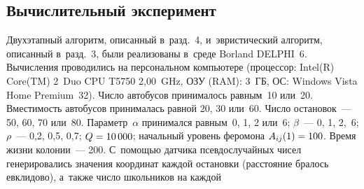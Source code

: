 \begin{multicols}{2}
\vspace*{-9pt}



\section{Вычислительный эксперимент}

\vspace*{-2pt}

     Двухэтапный алгоритм, описанный в~разд.~4, и~эвристический алгоритм,
описанный в~разд.~3, были реализованы в~среде Borland DELPHI~6. Вычисления
проводились на персональном компьютере
(процессор: Intel(R) Core(TM) 2~Duo CPU T5750 2,00~GHz,
ОЗУ (RAM): 3~ГБ, ОС: Windows Vista Home Premium~32). Число автобусов
принималось равным~10 или~20. Вместимость автобусов принималась равной
20, 30 или~60. Число остановок~--- 50, 60, 70 или~80. Параметр~$\alpha$
принимался равным~0, 1, 2 или~6; $\beta$~--- 0, 1, 2,~6; $\rho$~---
0,2, 0,5, 0,7;
$Q\hm = 10\,000$; начальный уровень феромона $A_{ij}(1) \hm= 100$. Время
жизни колонии~--- 200. С~помощью датчика псевдослучайных чисел
генерировались значения
 координат каждой остановки
(расстояние бралось
 евклидово), а~также чис\-ло школьников на каждой\linebreak\vspace*{-12pt}

\pagebreak

\end{multicols}

     \begin{figure} %
         \vspace*{1pt}
 \begin{center}
 \mbox{%
 \epsfxsize=162.28mm
 }
\end{center}
 \vspace*{-13pt}
              \vspace*{3pt}
 \begin{center}
 \mbox{%
 \epsfxsize=162.28mm
 }
\end{center}
 \vspace*{-13pt}
\vspace*{-3pt}
      \end{figure}


